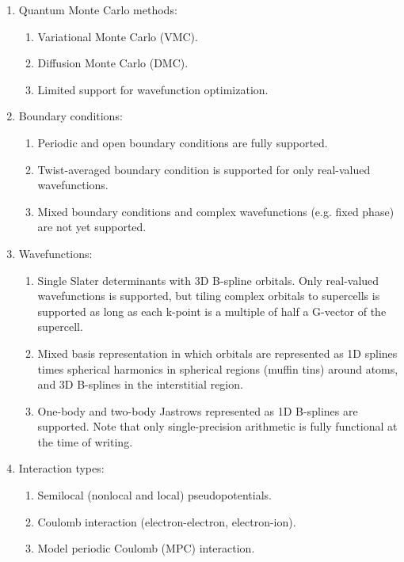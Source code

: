 \begin{enumerate}

  \item Quantum Monte Carlo methods:

    \begin{enumerate}
	\item Variational Monte Carlo (VMC).
	\item Diffusion Monte Carlo (DMC).
	\item Limited support for wavefunction optimization.
    \end{enumerate}

  \item Boundary conditions:

    \begin{enumerate}
	\item Periodic and open boundary conditions are fully supported.
	\item Twist-averaged boundary condition is supported for only real-valued wavefunctions.
	\item Mixed boundary conditions and complex wavefunctions (e.g. fixed phase) are not yet supported. 
    \end{enumerate}

  \item Wavefunctions:

    \begin{enumerate}
	\item Single Slater determinants with 3D B-spline orbitals. Only real-valued wavefunctions is supported, but tiling complex orbitals to supercells is supported as long as each k-point is a multiple of half a G-vector of the supercell.
	\item Mixed basis representation in which orbitals are represented as 1D splines times spherical harmonics in spherical regions (muffin tins) around atoms, and 3D B-splines in the interstitial region.
	\item One-body and two-body Jastrows represented as 1D B-splines are supported. Note that only single-precision arithmetic is fully functional at the time of writing. 
    \end{enumerate}

  \item Interaction types:

    \begin{enumerate}
	\item Semilocal (nonlocal and local) pseudopotentials.
	\item Coulomb interaction (electron-electron, electron-ion).
	\item Model periodic Coulomb (MPC) interaction.
    \end{enumerate}

\end{enumerate}


